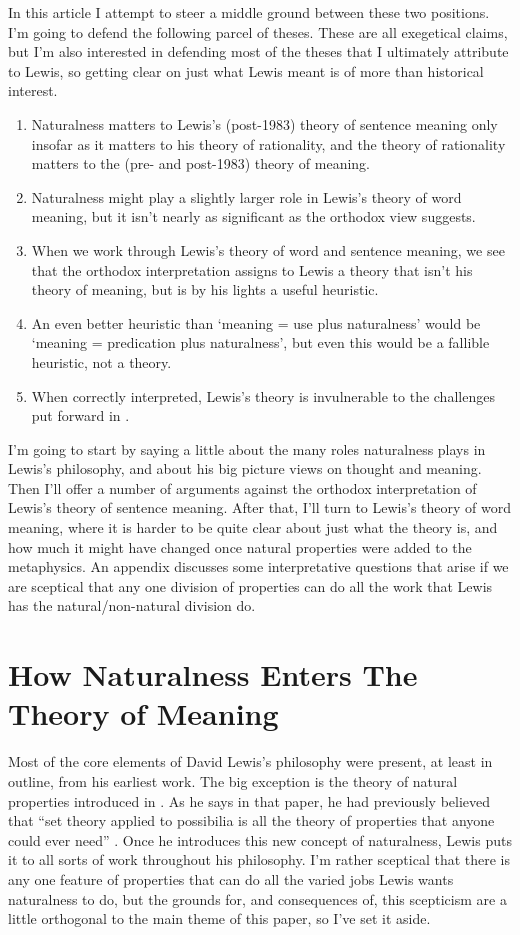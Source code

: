 In this article I attempt to steer a middle ground between these two positions. I'm going to defend the following parcel of theses. These are all exegetical claims, but I'm also interested in defending most of the theses that I ultimately attribute to Lewis, so getting clear on just what Lewis meant is of more than historical interest.

\begin{enumerate}
\item Naturalness matters to Lewis's (post-1983) theory of sentence meaning only insofar as it matters to his theory of rationality, and the theory of rationality matters to the (pre- and post-1983) theory of meaning.
\item Naturalness might play a slightly larger role in Lewis's theory of word meaning, but it isn't nearly as significant as the orthodox view suggests.
\item When we work through Lewis's theory of word and sentence meaning, we see that the orthodox interpretation assigns to Lewis a theory that isn't his theory of meaning, but is by his lights a useful heuristic.
\item An even better heuristic than `meaning = use plus naturalness' would be `meaning = predication plus naturalness', but even this would be a fallible heuristic, not a theory.
\item When correctly interpreted, Lewis's theory is invulnerable to the challenges put forward in \citet{Williams2007}.
\end{enumerate} 

I'm going to start by saying a little about the many roles naturalness plays in Lewis's philosophy, and about his big picture views on thought and meaning. Then I'll offer a number of arguments against the orthodox interpretation of Lewis's theory of sentence meaning. After that, I'll turn to Lewis's theory of word meaning, where it is harder to be quite clear about just what the theory is, and how much it might have changed once natural properties were added to the metaphysics. An appendix discusses some interpretative questions that arise if we are sceptical that any one division of properties can do all the work that Lewis has the natural/non-natural division do.

\section{How Naturalness Enters The Theory of Meaning}

Most of the core elements of David Lewis's philosophy were present, at least in outline, from his earliest work. The big exception is the theory of natural properties introduced in \citet{Lewis1983e}. As he says in that paper, he had previously believed that ``set theory applied to possibilia is all the theory of properties that anyone could ever need'' \citep[377n]{Lewis1983e}. Once he introduces this new concept of naturalness, Lewis puts it to all sorts of work throughout his philosophy. I'm rather sceptical that there is any one feature of properties that can do all the varied jobs Lewis wants naturalness to do, but the grounds for, and consequences of, this scepticism are a little orthogonal to the main theme of this paper, so I've set it aside.

